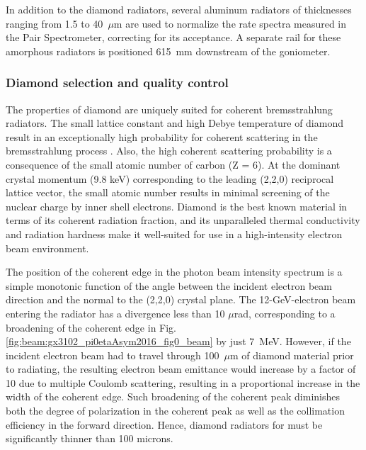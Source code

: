 In addition to the diamond radiators, several aluminum radiators of thicknesses ranging from 1.5 to 40~$\mu$m are used to normalize the rate spectra measured in the Pair Spectrometer, correcting for its acceptance.
A separate rail for these amorphous radiators is 
positioned 615~mm downstream of the goniometer. 


\subsubsection{Diamond selection and quality control \label{sec:diamonds}}
The properties of diamond are uniquely suited for coherent brems\-strah\-lung radiators.
The small lattice constant and high Debye temperature of diamond result in an exceptionally high probability
for coherent scattering in the brems\-strah\-lung process \cite{Bilokon:1983}.
Also, the high coherent scattering probability is a consequence of the small atomic number of carbon (Z = 6). At the dominant crystal momentum (9.8 keV) corresponding to the leading (2,2,0) reciprocal lattice vector, the small atomic number results in minimal screening of the nuclear charge by inner shell electrons.
Diamond is the best known material in terms of its coherent radiation
fraction, and its unparalleled thermal conductivity and radiation hardness make it
well-suited for use in a high-intensity electron beam environment.

The position of the coherent edge in the photon beam intensity spectrum is a simple monotonic
function of the angle between the incident electron beam direction and the normal to the (2,2,0)
crystal plane. The 12-GeV-electron beam entering the radiator has a divergence less than
10 $\mu$rad, corresponding to a broadening of the coherent edge in
Fig.\,\ref{fig:beam:gx3102_pi0etaAsym2016_fig0_beam} by just 7~MeV. However, if the 
incident electron beam had 
to travel through 100~$\mu$m of diamond material prior to radiating, the
resulting electron beam emittance would
increase by a factor of 10 due to multiple Coulomb scattering, resulting in a proportional increase
in the width of the coherent edge. Such broadening of the coherent peak diminishes both the degree of polarization in the coherent peak as well as the collimation efficiency in the forward direction.
Hence, diamond radiators for \GX{} must be significantly
thinner than 100 microns. 

